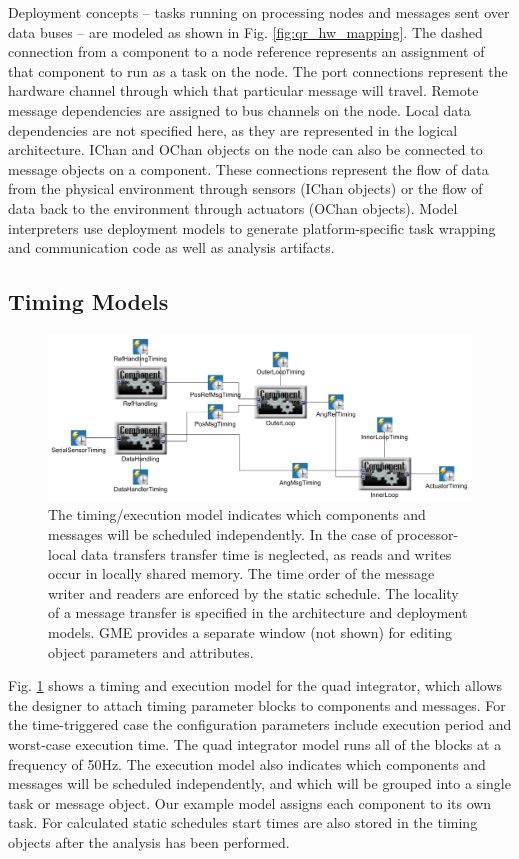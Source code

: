 Deployment concepts -- tasks running on processing nodes and messages sent over data buses -- are modeled 
as shown in Fig. \ref{fig:qr_hw_mapping}.  The dashed connection from a component to a node reference 
represents an assignment of that component to run as a task on the node.  The port connections represent
the hardware channel through which that particular message will travel.  Remote message dependencies 
are assigned to bus channels on the node.  Local data dependencies are not specified here, as they are
represented in the logical architecture.  IChan and OChan objects on the node can also be connected to 
message objects on a component.  These connections represent the flow of data from the physical 
environment through sensors (IChan objects) or the flow of data back to the environment through actuators
(OChan objects).  Model interpreters use deployment models to 
generate platform-specific task wrapping and communication code as well as analysis artifacts.

\subsection{Timing Models}

\begin{figure}
\centering
\includegraphics[width=0.8\columnwidth]{figures/quadrotor_timing.png}
   \caption{The timing/execution model indicates which components and
messages will be scheduled independently.  In the case of
processor-local data transfers transfer time is neglected, as reads and
writes occur in locally shared memory.  The time order of the message writer 
and readers are enforced by the static schedule. The locality of a message transfer is
specified in the architecture and deployment models.  GME provides a separate
window (not shown) for editing object parameters and attributes.}
   \label{fig:qr_timing}
\end{figure}

Fig. \ref{fig:qr_timing} shows a timing and execution model for the quad integrator, which allows 
the designer to attach timing parameter
blocks to components and messages.  For the time-triggered case the configuration 
parameters include execution period and worst-case execution time.  The quad integrator
model runs all of the blocks at a frequency of 50Hz.  The execution model also indicates 
which components and messages will be scheduled independently, and which will be
grouped into a single task or message object.  Our example model assigns each component to its own task.  For calculated static schedules start times are also 
stored in the timing objects after the analysis has been performed.

